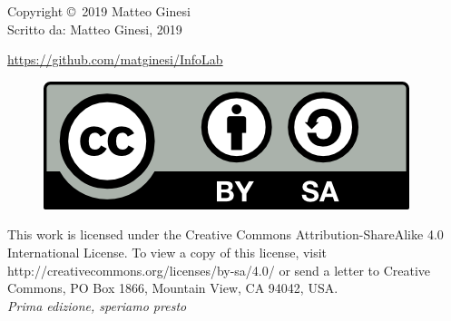 \documentclass[12pt,fleqn,a4paper]{book} %
\begin{document}
    \noindent Copyright \copyright\ 2019 Matteo Ginesi\\ %
 
 	\noindent Scritto da: Matteo Ginesi, 2019   
 	
    
    \noindent \url{https://github.com/matginesi/InfoLab}\\ %
    
    \begin{figure}[h!]
    	\centering\includegraphics[scale=1]{Pictures/by-sa.png}
    \end{figure}
    
    \noindent This work is licensed under the Creative Commons Attribution-ShareAlike 4.0 International License. To view a copy of this license, visit http://creativecommons.org/licenses/by-sa/4.0/ or send a letter to Creative Commons, PO Box 1866, Mountain View, CA 94042, USA.\\
    
    \noindent \textit{Prima edizione, speriamo presto} %
    
    
    
    
    \pagestyle{empty} %
    
    \tableofcontents %
    
    \cleardoublepage %
    
    \pagestyle{fancy} %
    
\end{document}
